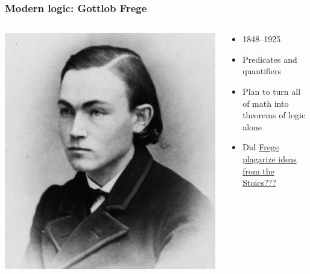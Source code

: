 \begin{frame}
  \frametitle{Modern logic: Gottlob Frege}

  \begin{columns}
    \begin{column}{.5\textwidth}
      \includegraphics[height=.8\textheight]{../assets/frege}
    \end{column}
    \begin{column}{.5\textwidth}
      \begin{itemize}[<+->]
        \item 1848--1925
        \item Predicates and quantifiers
        \item Plan to turn all of math into theorems of logic alone
        \item Did \href{https://dailynous.com/2021/02/03/frege-plagiarize-stoics/}{Frege plagarize ideas from the Stoics???}
      \end{itemize}
    \end{column}
  \end{columns}
\end{frame}

